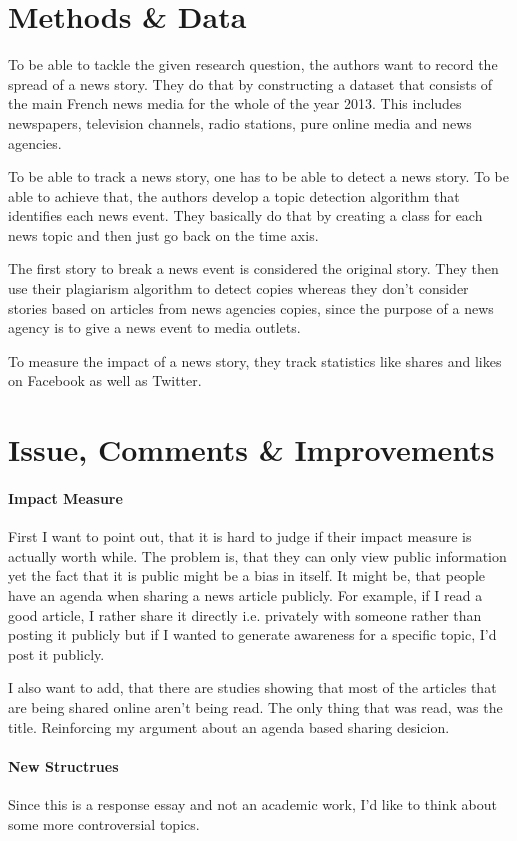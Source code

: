 \documentclass[12pt]{article}
\begin{document}
\section{Methods \& Data}
To be able to tackle the given research question, the authors want to record
the spread of a news story. They do that by constructing a dataset that
consists of the main French news media for the whole of the year 2013. This
includes newspapers, television channels, radio stations, pure online media and
news agencies.

To be able to track a news story, one has to be able to detect a news story.
To be able to achieve that, the authors develop a topic detection algorithm
that identifies each news event. They basically do that by creating a class
for each news topic and then just go back on the time axis.

The first story to break a news event is considered the original story. They
then use their plagiarism algorithm to detect copies whereas they don't
consider stories based on articles from news agencies copies, since the purpose
of a news agency is to give a news event to media outlets.

To measure the impact of a news story, they track statistics like shares and
likes on Facebook as well as Twitter.

\section{Issue, Comments \& Improvements}
\paragraph{Impact Measure} First I want to point out, that it is hard to judge
if their impact measure is actually worth while. The problem is, that they can
only view public information yet the fact that it is public might be a bias
in itself. It might be, that people have an agenda when sharing a news article
publicly. For example, if I read a good article, I rather share it directly
i.e. privately with someone rather than posting it publicly but if I wanted to
generate awareness for a specific topic, I'd post it publicly.

I also want to add, that there are studies showing that most of the articles
that are being shared online aren't being read. The only thing that was read,
was the title. Reinforcing my argument about an agenda based sharing desicion.

\paragraph{New Structrues} Since this is a response essay
and not an academic work, I'd like to think about some more controversial
topics.
\end{document}
